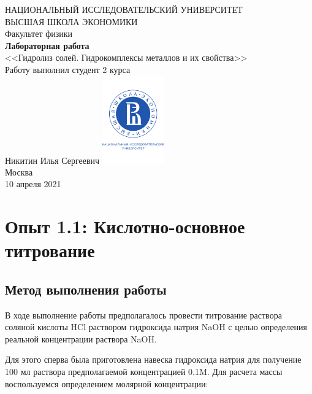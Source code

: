 \documentclass[a4paper, 12pt]{article}
\begin{document}
	\begin{titlepage}
		\begin{center}
			$$$$
			$$$$
			$$$$
			$$$$
			{\Large{НАЦИОНАЛЬНЫЙ ИССЛЕДОВАТЕЛЬСКИЙ УНИВЕРСИТЕТ}}\\
			\vspace{0.1cm}
			{\Large{ВЫСШАЯ ШКОЛА ЭКОНОМИКИ}}\\
			\vspace{0.25cm}
			{\large{Факультет физики}}\\
			\vspace{5.5cm}
			{\Huge\textbf{{Лабораторная работа}}}\\%
			\vspace{1cm}
			{\LARGE{<<Гидролиз солей. Гидрокомплексы металлов и их свойства>>}}\\%
			\vspace{2cm}
			{Работу выполнил студент 2 курса}\\
			{Никитин Илья Сергеевич}
			\vfill
			\includegraphics[width = 0.2\textwidth]{HSElogo}\\
			\vfill
			Москва\\
			10 апреля 2021
		\end{center}
	\end{titlepage}

\tableofcontents

\newpage
\section{Опыт 1.1: Кислотно-основное титрование}
\subsection{Метод выполнения работы}

В ходе выполнение работы предполагалось провести титрование раствора соляной кислоты HCl раствором гидроксида натрия NaOH с целью определения реальной концентрации раствора NaOH.

Для этого сперва была приготовлена навеска гидроксида натрия для получение 100 мл раствора предполагаемой концентрацией 0.1M. Для расчета массы воспользуемся определением молярной концентрации:
\end{document}
